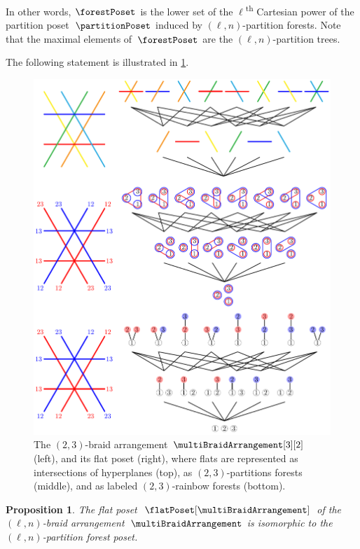 \documentclass{amsart}
\newtheorem{proposition}[theorem]{Proposition}
\theoremstyle{definition}
\newcommand{\ordinal}{\textsuperscript{th}} %
\begin{document}
In other words, $\forestPoset$ is the lower set of the $\ell$\ordinal{} Cartesian power of the partition poset~$\partitionPoset$ induced by $(\ell,n)$-partition forests.
Note that the maximal elements of~$\forestPoset$ are the $(\ell, n)$-partition trees.

The following statement is illustrated in \cref{fig:intersectionPosetMultiBraidArrangement32}.
%
\begin{figure}
	\centerline{\includegraphics[scale=.9]{figures/intersectionPosetMultiBraidArrangement32Full}}
	\caption{The $(2,3)$-braid arrangement $\multiBraidArrangement[3][2]$ (left), and its flat poset (right), where flats are represented as intersections of hyperplanes (top), as $(2,3)$-partitions forests (middle), and as labeled $(2,3)$-rainbow forests (bottom).}
	\label{fig:intersectionPosetMultiBraidArrangement32}
\end{figure}

\begin{proposition}
\label{prop:flatPosetMultiBraidArrangement}
The flat poset~$\flatPoset[\multiBraidArrangement]$ of the $(\ell,n)$-braid arrangement~$\multiBraidArrangement$ is isomorphic to the $(\ell,n)$-partition forest poset.
\end{proposition}
\end{document}
